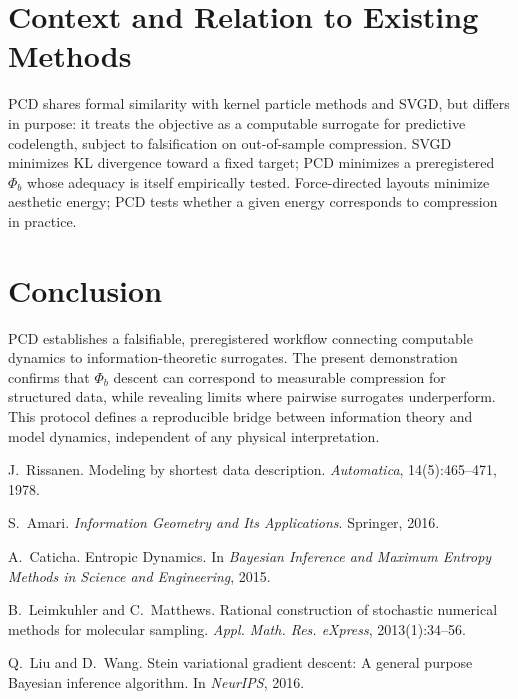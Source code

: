 \documentclass[11pt]{article}
\begin{document}
\section{Context and Relation to Existing Methods}
PCD shares formal similarity with kernel particle methods and SVGD, but differs in purpose:
it treats the objective as a computable surrogate for predictive codelength, subject to falsification on out-of-sample compression.
SVGD minimizes KL divergence toward a fixed target; PCD minimizes a preregistered $\Phi_b$ whose adequacy is itself empirically tested.
Force-directed layouts minimize aesthetic energy; PCD tests whether a given energy corresponds to compression in practice.

\section{Conclusion}
PCD establishes a falsifiable, preregistered workflow connecting computable dynamics to information-theoretic surrogates. 
The present demonstration confirms that $\Phi_b$ descent can correspond to measurable compression for structured data, while revealing limits where pairwise surrogates underperform.
This protocol defines a reproducible bridge between information theory and model dynamics, independent of any physical interpretation.


\begin{thebibliography}{9}

J.~Rissanen.
\newblock Modeling by shortest data description.
\newblock \emph{Automatica}, 14(5):465–471, 1978.

S.~Amari.
\newblock \emph{Information Geometry and Its Applications}.
\newblock Springer, 2016.

A.~Caticha.
\newblock Entropic Dynamics.
\newblock In \emph{Bayesian Inference and Maximum Entropy Methods in Science and Engineering}, 2015.

B.~Leimkuhler and C.~Matthews.
\newblock Rational construction of stochastic numerical methods for molecular sampling.
\newblock \emph{Appl. Math. Res. eXpress}, 2013(1):34–56.

Q.~Liu and D.~Wang.
\newblock Stein variational gradient descent: A general purpose Bayesian inference algorithm.
\newblock In \emph{NeurIPS}, 2016.

\end{thebibliography}
\end{document}
